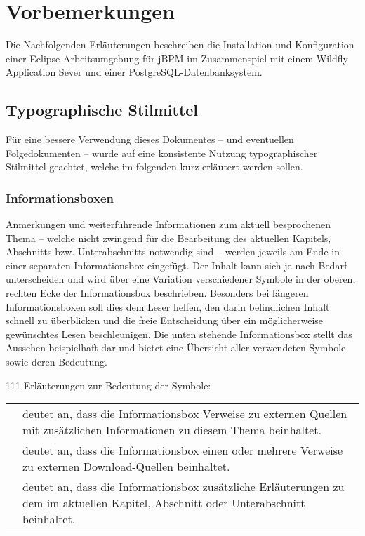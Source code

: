 \section{Vorbemerkungen}
Die Nachfolgenden Erläuterungen beschreiben die Installation und Konfiguration einer Eclipse-Arbeitsumgebung für jBPM im Zusammenspiel mit einem Wildfly Application Sever und einer PostgreSQL-Datenbanksystem.

\subsection{Typographische Stilmittel}
Für eine bessere Verwendung dieses Dokumentes -- und eventuellen Folgedokumenten -- wurde auf eine konsistente Nutzung typographischer Stilmittel geachtet, welche im folgenden kurz erläutert werden sollen.

\subsubsection{Informationsboxen}
Anmerkungen und weiterführende Informationen zum aktuell besprochenen Thema -- welche nicht zwingend für die Bearbeitung des aktuellen Kapitels, Abschnitts bzw. Unterabschnitts notwendig sind -- werden jeweils am Ende in einer separaten Informationsbox eingefügt. Der Inhalt kann sich je nach Bedarf unterscheiden und wird über eine Variation verschiedener Symbole in der oberen, rechten Ecke der Informationsbox beschrieben. Besonders bei längeren Informationsboxen soll dies dem Leser helfen, den darin befindlichen Inhalt schnell zu überblicken und die freie Entscheidung über ein möglicherweise gewünschtes Lesen beschleunigen. Die unten stehende Informationsbox stellt das Aussehen beispielhaft dar und bietet eine Übersicht aller verwendeten Symbole sowie deren Bedeutung.
\begin{info}{111}
	Erläuterungen zur Bedeutung der Symbole:\\[1em]
	\begin{tabular}{m{2em}m{}}
	\bookmarkicon	& deutet an, dass die Informationsbox Verweise zu externen Quellen mit zusätzlichen Informationen zu diesem Thema beinhaltet. \\[0.5em] 
	\downloadicon	& deutet an, dass die Informationsbox einen oder mehrere Verweise zu externen Download-Quellen beinhaltet. \\[0.5em]
	\fileicon	& deutet an, dass die Informationsbox zusätzliche Erläuterungen zu dem im aktuellen Kapitel, Abschnitt oder Unterabschnitt beinhaltet.
	\end{tabular}
\end{info}
